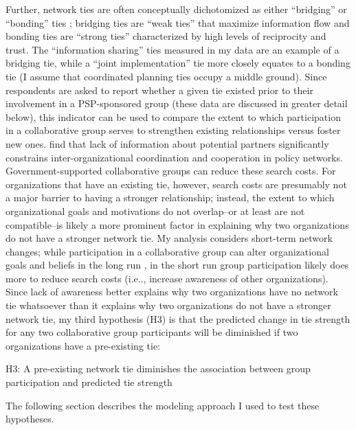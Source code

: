 \documentclass[12pt,a4paper,titlepage]{article}
\begin{document}
Further, network ties are often conceptually dichotomized as either ``bridging'' or ``bonding'' ties \parencite{berardo2010,berardo2014}; bridging ties are ``weak ties'' \parencite{granovetter1985} that maximize information flow and bonding ties are ``strong ties'' characterized by high levels of reciprocity and trust. The ``information sharing'' ties measured in my data are an example of a bridging tie, while a ``joint implementation'' tie more closely equates to a bonding tie (I assume that coordinated planning ties occupy a middle ground). Since respondents are asked to report whether a given tie existed prior to their involvement in a PSP-sponsored group (these data are discussed in greater detail below), this indicator can be used to compare the extent to which participation in a collaborative group serves to strengthen existing relationships versus foster new ones. \textcite{scholz2008} find that lack of information about potential partners significantly constrains inter-organizational coordination and cooperation in policy networks. Government-supported collaborative groups can reduce these search costs. For organizations that have an existing tie, however, search costs are presumably not a major barrier to having a stronger relationship; instead, the extent to which organizational goals and motivations do not overlap--or at least are not compatible--is likely a more prominent factor in explaining why two organizations do not have a stronger network tie. My analysis considers short-term network changes; while participation in a collaborative group can alter organizational goals and beliefs in the long run \parencite[e.g.,][]{bingham2008,leach2005,lubell2005}, in the short run group participation likely does more to reduce search costs (i.e.., increase awareness of other organizations). Since lack of awareness better explains why two organizations have no network tie whatsoever than it explains why two organizations do not have a stronger network tie, my third hypothesis (H3) is that the predicted change in tie strength for any two collaborative group participants will be diminished if two organizations have a pre-existing tie:


\begin{description}
\item{H3: A pre-existing network tie diminishes the association between group participation and predicted tie strength}
\end{description}

\noindent
The following section describes the modeling approach I used to test these hypotheses. 
\end{document}
